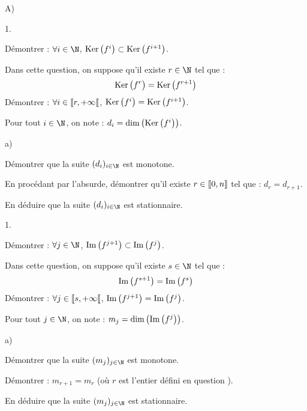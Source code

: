 \documentclass[11pt]{article}%
\begin{document}
  \begin{noliste}{A)}
  \item {}
    \begin{noliste}{1.}
    \item Démontrer : $\forall i \in \N$, $\operatorname{Ker}\big( f^i \big) \subset
      \operatorname{Ker}\big( f^{i+1} \big)$.
    \item Dans cette question, on suppose qu'il existe $r \in \N$ tel
      que :
      \[
      \operatorname{Ker}\big( f^{r} \big) = \operatorname{Ker}\big( f^{r+1} \big)
      \]
      Démontrer : $\forall i \in \llbracket r, +\infty \llbracket$, $\operatorname{Ker}\big( f^i
      \big) = \operatorname{Ker}\big( f^{i+1} \big)$.
    \item Pour tout $i \in \N$, on note : $d_i = \dim\left(
        \operatorname{Ker}\big(f^{i}\big) \right)$.
      \begin{noliste}{a)}
      \item Démontrer que la suite $(d_i)_{i\in\N}$ est monotone.
      \item En procédant par l'absurde, démontrer qu'il existe $r \in
        \llbracket 0, n \rrbracket$ tel que : $d_r = d_{r+1}$.
      \item En déduire que la suite $(d_i)_{i\in\N}$ est
        stationnaire.
      \end{noliste}
    \end{noliste}

  \item {}
    \begin{noliste}{1.}
    \item Démontrer : $\forall j \in \N$, $\operatorname{Im}\big( f^{j+1} \big)
      \subset \operatorname{Im}\big( f^{j} \big)$.
    \item Dans cette question, on suppose qu'il existe $s \in \N$ tel
      que :
      \[
      \operatorname{Im}\big( f^{s+1} \big) = \operatorname{Im}\big( f^{s} \big)
      \]
      Démontrer : $\forall j \in \llbracket s, +\infty \llbracket$, $\operatorname{Im}\big(
      f^{j+1} \big) = \operatorname{Im}\big( f^{j} \big)$.
    \item Pour tout $j \in \N$, on note : $m_j = \dim\left(
        \operatorname{Im}\big(f^{j}\big) \right)$.
      \begin{noliste}{a)}
      \item Démontrer que la suite $(m_j)_{j\in\N}$ est monotone.
      \item Démontrer : $m_{r+1} = m_{r}$ (où $r$ est l'entier défini
        en question ).
      \item En déduire que la suite $(m_j)_{j\in\N}$ est stationnaire.
      \end{noliste}
    \end{noliste}
  \end{noliste}
\end{document}

